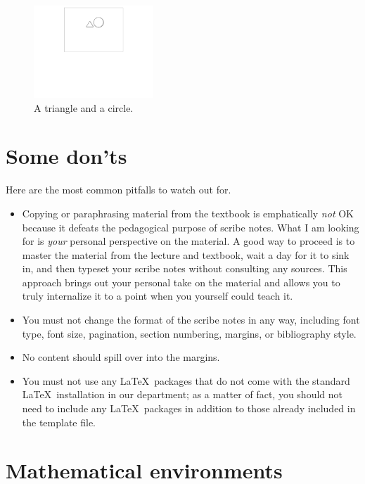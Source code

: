 \documentclass[usletter]{article}
\begin{document}
\begin{figure}
\begin{center}
\includegraphics[width=0.4\textwidth]{triangle-circle}
\end{center}
\caption{A triangle and a circle.}
\label{fig:triangle-circle}
\end{figure}

\section{Some don'ts}

Here are the most common pitfalls to watch out for.

\begin{itemize}
\item Copying or paraphrasing material from the
textbook is emphatically \emph{not} OK because it
defeats the pedagogical purpose of scribe notes.  What
I am looking for is \emph{your} personal perspective on
the material. A good way to proceed is to master the
material from the lecture and textbook, wait a day
for it to sink in, and then typeset your scribe notes
without consulting any sources. This approach brings
out your personal take on the material and allows you
to truly internalize it to a point when you yourself
could teach it.

\item You must not change the format of the scribe
notes in any way, including font type, font size,
pagination, section numbering, margins, or bibliography
style.

\item No content should spill over into the margins.

\item You must not use any \LaTeX\ packages that do not
come with the standard \LaTeX\ installation in our
department; as a matter of fact, you should not need to
include any \LaTeX\ packages in addition to those
already included in the template file.
\end{itemize}


\section{Mathematical environments}
\end{document}

